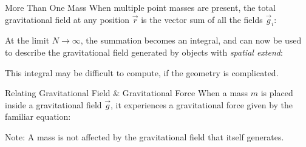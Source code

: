 \documentclass[12pt,compress,aspectratio=169]{beamer}
\begin{document}
\begin{frame}{More Than One Mass}
  When multiple point masses are present, the total gravitational field at any
  position $\vec r$ is the vector sum of all the fields $\vec g_i$:
    

  At the limit $N\rightarrow\infty$, the summation becomes an integral, and can
  now be used to describe the gravitational field generated by objects with
  \emph{spatial extend}:

  
  This integral may be difficult to compute, if the geometry is complicated.
\end{frame}




\begin{frame}{Relating Gravitational Field \& Gravitational Force}
  When a mass $m$ is placed inside a gravitational field $\vec g$, it
  experiences a gravitational force given by the familiar equation:

  
  Note: A mass is not affected by the gravitational field that itself
  generates.
\end{frame}
\end{document}
